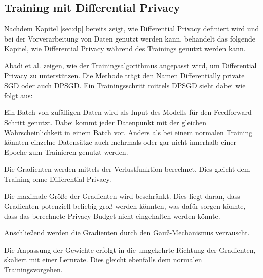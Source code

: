 \subsection{Training mit Differential Privacy}\label{sec:dp_training}

Nachdem Kapitel \ref{sec:dp} bereits zeigt, wie Differential Privacy definiert wird und bei der Vorverarbeitung von Daten genutzt werden kann, behandelt das folgende Kapitel, wie Differential Privacy während des Trainings genutzt werden kann.

Abadi et al. \cite{P-28} zeigen, wie der Trainingsalgorithmus angepasst wird, um Differential Privacy zu unterstützen.
Die Methode trägt den Namen Differentially private SGD oder auch DPSGD.
Ein Trainingsschritt mittels DPSGD sieht dabei wie folgt aus:
\begin{compactenum}
    \item Ein Batch von zufälligen Daten wird als Input des Modells für den Feedforward Schritt genutzt. Dabei kommt jeder Datenpunkt mit der gleichen Wahrscheinlichkeit in einem Batch vor. Anders als bei einem normalen Training könnten einzelne Datensätze auch mehrmals oder gar nicht innerhalb einer Epoche zum Trainieren genutzt werden. 
    \item Die Gradienten werden mittels der Verlustfunktion berechnet. Dies gleicht dem Training ohne Differential Privacy.
    \item Die maximale Größe der Gradienten wird beschränkt. Dies liegt daran, dass Gradienten potenziell beliebig groß werden könnten, was dafür sorgen könnte, dass das berechnete Privacy Budget nicht eingehalten werden könnte.
    \item Anschließend werden die Gradienten durch den Gauß-Mechanismus verrauscht. 
    \item Die Anpassung der Gewichte erfolgt in die umgekehrte Richtung der Gradienten, skaliert mit einer Lernrate. Dies gleicht ebenfalls dem normalen Trainingsvorgehen.
\end{compactenum}

